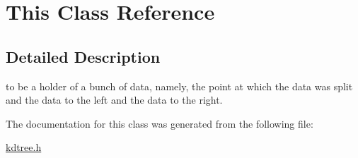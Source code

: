 \hypertarget{classThis}{}\section{This Class Reference}
\label{classThis}


\subsection{Detailed Description}
to be a holder of a bunch of data, namely, the point at which the data was split and the data to the left and the data to the right. 

The documentation for this class was generated from the following file\+:\begin{DoxyCompactItemize}
\item 
\hyperlink{kdtree_8h}{kdtree.\+h}\end{DoxyCompactItemize}
